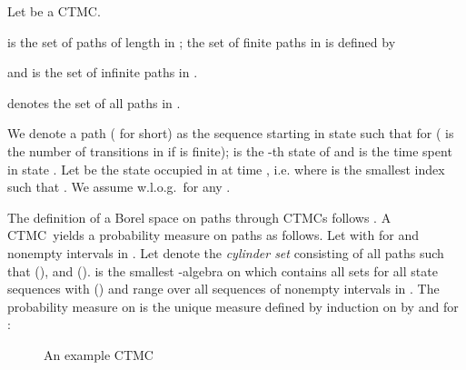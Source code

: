 \documentclass{LMCS}
\newcommand{\<}{\langle}
\renewcommand{\>}{\rangle}
\newcommand{\CTMC}{\textsc{{CTMC}}}
\begin{document}
\begin{defi}
Let  be a \CTMC.

is the set of paths of length  in ; the set of finite
paths in  is defined by

and  is the set of infinite paths in .

denotes the set of all paths in .
\end{defi}

We denote a path 
( for short) as the sequence
 starting in state 
such that for  ( is the number of
transitions in  if  is finite);  is the
-th state of  and  is the time spent in
state . Let  be the state occupied in  at
time , i.e.  where  is
the smallest index such that . We assume w.l.o.g.\  for any .

The definition of a Borel space on paths through \CTMC s follows
\cite{Var85,BHHK03}. A \CTMC\  yields a probability measure  on paths as
follows.  Let  with 
for  and  nonempty
intervals in .
Let  denote the \emph{cylinder
set} consisting of all paths  such that
 (), and  ().
 is the smallest -algebra on
 which contains all sets  for all state sequences  with
 () and 
range over all sequences of nonempty intervals in .
The probability measure  on 
is the unique measure defined by induction on  by
 and for :


\begin{figure}
 \vspace{-0.6cm}\caption{An example CTMC\label{fig:CTMC_1c_1}}
\end{figure}
\end{document}

